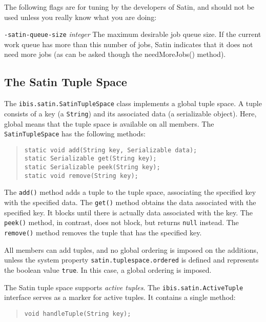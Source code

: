 \documentclass[10pt]{article}
\newcommand{\mysubsection}[1]{\subsection{#1}\label{#1}}
\begin{document}
The following flags are for tuning by the developers of Satin,
and should not be used unless you really know what you are doing:
\begin{description}
\item{\texttt{-satin-queue-size} \emph{integer}}
The maximum desirable job queue size. If the current work queue 
has more than this number of jobs, Satin indicates that 
it does not need more jobs (as can be asked though the
needMoreJobs() method).
\end{description}

\mysubsection{The Satin Tuple Space}

The \texttt{ibis.satin.SatinTupleSpace} class implements a global tuple
space.  A tuple consists of a key (a \texttt{String}) and its associated
data (a serializable object). Here, global means that the tuple space is
available on all members. The \texttt{SatinTupleSpace} has the following
methods:

\begin{quote}
\begin{verbatim}
static void add(String key, Serializable data);
static Serializable get(String key);
static Serializable peek(String key);
static void remove(String key);
\end{verbatim}
\end{quote}

The \texttt{add()} method adds a tuple to the tuple space, associating the
specified key with the specified data.
The \texttt{get()} method obtains the data associated with the specified key.
It blocks until there is actually data associated with the key.
The \texttt{peek()} method, in contrast, does not block, but returns
\texttt{null} instead.
The \texttt{remove()} method removes the tuple that has the specified key.

All members can add tuples, and no global ordering is imposed on the
additions, unless the system property
\texttt{satin.tuplespace.ordered} is defined and represents the
boolean value \texttt{true}. In this case, a global ordering is imposed.

The Satin tuple space supports \emph{active tuples}.
The \texttt{ibis.satin.ActiveTuple} interface serves
as a marker for active tuples. It contains a single method:

\begin{quote}
\begin{verbatim}
void handleTuple(String key);
\end{verbatim}
\end{quote}
\end{document}
